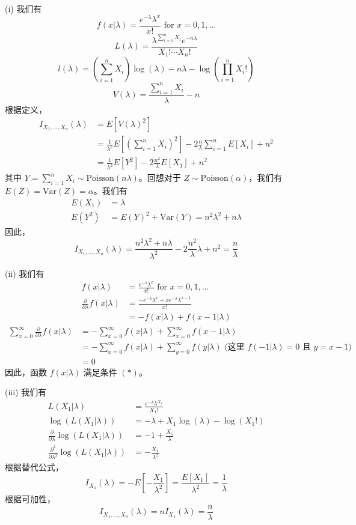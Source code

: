 \begin{questions}
\begin{solution}
(i) 我们有
\[
f(x|\lambda) = \frac{e^{-\lambda}\lambda^x}{x!} \text{ for } x = 0, 1, \dots
\]
\[
L(\lambda) = \frac{\lambda^{\sum_{i=1}^{n} X_i}e^{-n\lambda}}{X_1! \cdots X_n!}
\]
\[
l(\lambda) = \left( \sum_{i=1}^{n} X_i \right) \log(\lambda) - n\lambda - \log\left( \prod_{i=1}^{n} X_i! \right)
\]
\[
V(\lambda) = \frac{\sum_{i=1}^{n} X_i}{\lambda} - n
\]
根据定义，
\begin{align*}
I_{X_1, \dots, X_n}(\lambda) &= E[V(\lambda)^2] \\
&= \frac{1}{\lambda^2} E\left[ \left( \sum_{i=1}^{n} X_i \right)^2 \right] - 2\frac{n}{\lambda} \sum_{i=1}^{n} E[X_i] + n^2 \\
&= \frac{1}{\lambda^2} E[Y^2] - 2\frac{n^2}{\lambda} E[X_1] + n^2
\end{align*}
其中 $Y = \sum_{i=1}^{n} X_i \sim \text{Poisson}(n\lambda)$。回想对于 $Z \sim \text{Poisson}(\alpha)$，我们有 $E(Z) = \text{Var}(Z) = \alpha$。我们有
\begin{align*}
E(X_1) &= \lambda \\
E(Y^2) &= E(Y)^2 + \text{Var}(Y) = n^2\lambda^2 + n\lambda
\end{align*}
因此，
\[
I_{X_1, \dots, X_n}(\lambda) = \frac{n^2\lambda^2 + n\lambda}{\lambda^2} - 2\frac{n^2}{\lambda}\lambda + n^2 = \frac{n}{\lambda}
\]

(ii) 我们有
\begin{align*}
f(x|\lambda) &= \frac{e^{-\lambda}\lambda^x}{x!} \text{ for } x = 0, 1, \dots \\
\frac{\partial}{\partial \lambda} f(x|\lambda) &= \frac{-e^{-\lambda}\lambda^x + xe^{-\lambda}\lambda^{x-1}}{x!} \\
&= -f(x|\lambda) + f(x-1|\lambda)
\end{align*}
\begin{align*}
\sum_{x=0}^{\infty} \frac{\partial}{\partial \lambda} f(x|\lambda) &= -\sum_{x=0}^{\infty} f(x|\lambda) + \sum_{x=0}^{\infty} f(x-1|\lambda) \\
&= -\sum_{x=0}^{\infty} f(x|\lambda) + \sum_{y=0}^{\infty} f(y|\lambda) \text{ (这里 } f(-1|\lambda) = 0 \text{ 且 } y = x - 1) \\
&= 0
\end{align*}
因此，函数 $f(x|\lambda)$ 满足条件 $(*)$。

(iii) 我们有
\begin{align*}
L(X_1|\lambda) &= \frac{e^{-\lambda}\lambda^{X_1}}{X_1!} \\
\log(L(X_1|\lambda)) &= -\lambda + X_1 \log(\lambda) - \log(X_1!) \\
\frac{\partial}{\partial \lambda} \log(L(X_1|\lambda)) &= -1 + \frac{X_1}{\lambda} \\
\frac{\partial^2}{\partial \lambda^2} \log(L(X_1|\lambda)) &= -\frac{X_1}{\lambda^2}
\end{align*}
根据替代公式，
\[
I_{X_1}(\lambda) = -E\left[ -\frac{X_1}{\lambda^2} \right] = \frac{E[X_1]}{\lambda^2} = \frac{1}{\lambda}
\]
根据可加性，
\[
I_{X_1, \dots, X_n}(\lambda) = n I_{X_1}(\lambda) = \frac{n}{\lambda}
\]
\end{solution}


\end{questions}
